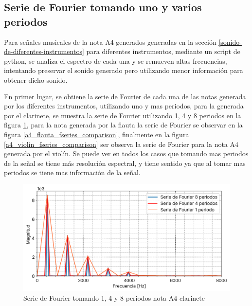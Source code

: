 \documentclass[12pt]{article}
\begin{document}
\hypertarget{serie-de-fourier-tomando-uno-y-varios-periodos
}{%
\subsection{Serie de Fourier tomando uno y varios periodos}\label{serie-de-fourier-tomando-uno-y-varios-periodos
}}

Para señales musicales de la nota A4 generados generadas en la sección \ref{sonido-de-diferentes-instrumentos} para diferentes instrumentos, mediante un script de python, se analiza el espectro de cada una y se remueven altas frecuencias, intentando preservar el sonido generado pero utilizando menor información para obtener dicho sonido.

En primer lugar, se obtiene la serie de Fourier de cada una de las notas generada por los diferentes instrumentos, utilizando uno y mas periodos, para la generada por el clarinete, se muestra la serie de Fourier utilizando 1, 4 y 8 periodos en la figura \ref{a4_clarinete_fseries_comparison}, para la nota generada por la flauta la serie de Fourier se observar en la figura \ref{a4_flauta_fseries_comparison}, finalmente en la figura \ref{a4_violin_fseries_comparison} ser observa la serie de Fourier para la nota A4 generada por el violín. Se puede ver en todos los casos que tomando mas periodos de la señal se tiene más resolución espectral, y tiene sentido ya que al tomar mas periodos se tiene mas información de la señal.


\begin{figure}[H]
\centering
\includegraphics{plot/a4_clarinete_fseries_comparison.png}
\caption{Serie de Fourier tomando 1, 4 y 8 periodos nota A4 clarinete}
\label{a4_clarinete_fseries_comparison}
\end{figure}
\end{document}
